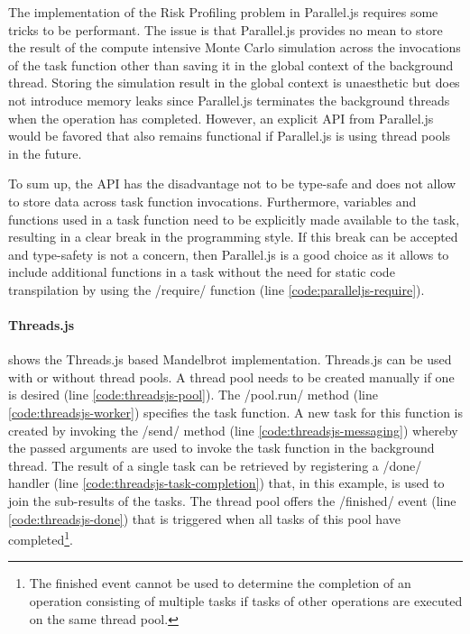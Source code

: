 The implementation of the Risk Profiling problem in Parallel.js requires some tricks to be performant. The issue is that Parallel.js provides no mean to store the result of the compute intensive Monte Carlo simulation across the invocations of the task function other than saving it in the global context of the background thread. Storing the simulation result in the global context is unaesthetic but does not introduce memory leaks since Parallel.js terminates the background threads when the operation has completed. However, an explicit API from Parallel.js would be favored that also remains functional if Parallel.js is using thread pools in the future.

To sum up, the API has the disadvantage not to be type-safe and does not allow to store data across task function invocations. Furthermore, variables and functions used in a task function need to be explicitly made available to the task, resulting in a clear break in the programming style. If this break can be accepted and type-safety is not a concern, then Parallel.js is a good choice as it allows to include additional functions in a task without the need for static code transpilation by using the \javascriptinline/require/ function (line \ref{code:paralleljs-require}).

\paragraph{Threads.js}
 shows the Threads.js based Mandelbrot implementation. Threads.js can be used with or without thread pools. A thread pool needs to be created manually if one is desired (line \ref{code:threadsjs-pool}). The \javascriptinline/pool.run/ method (line \ref{code:threadsjs-worker}) specifies the task function. A new task for this function is created by invoking the \javascriptinline/send/ method (line \ref{code:threadsjs-messaging}) whereby the passed arguments are used to invoke the task function in the background thread. The result of a single task can be retrieved by registering a \javascriptinline/done/ handler (line \ref{code:threadsjs-task-completion}) that, in this example, is used to join the sub-results of the tasks. The thread pool offers the \javascriptinline/finished/ event (line \ref{code:threadsjs-done}) that is triggered when all tasks of this pool have completed\footnote{The finished event cannot be used to determine the completion of an operation consisting of multiple tasks if tasks of other operations are executed on the same thread pool.}.

